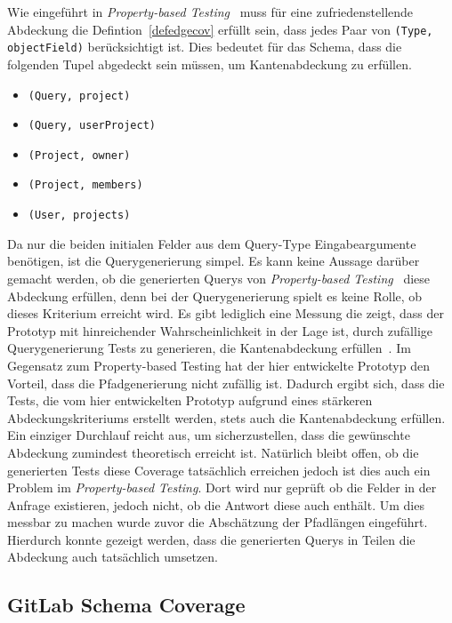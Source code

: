 Wie eingeführt in \textit{Property-based Testing}~\cite{property-based-testing} muss für eine zufriedenstellende Abdeckung
die Defintion~\ref{defedgecov} erfüllt sein, dass jedes Paar von \verb+(Type, objectField)+ berücksichtigt ist.
Dies bedeutet für das Schema, dass die folgenden Tupel abgedeckt sein müssen, um Kantenabdeckung zu erfüllen.
    \begin{itemize}
        \item \verb+(Query, project)+
        \item \verb+(Query, userProject)+
        \item \verb+(Project, owner)+
        \item \verb+(Project, members)+
        \item \verb+(User, projects)+
    \end{itemize}

Da nur die beiden initialen Felder aus dem Query-Type Eingabeargumente benötigen, ist die Querygenerierung simpel.
Es kann keine Aussage darüber gemacht werden, ob die generierten Querys von \textit{Property-based Testing}~\cite{property-based-testing} diese Abdeckung erfüllen, denn bei der Querygenerierung spielt es keine Rolle, ob dieses Kriterium erreicht wird.
Es gibt lediglich eine Messung die zeigt, dass der Prototyp mit hinreichender Wahrscheinlichkeit in der Lage ist, durch zufällige Querygenerierung Tests zu generieren, die Kantenabdeckung erfüllen~\cite[vgl. D.Results RQ1 ]{property-based-testing}.
Im Gegensatz zum Property-based Testing hat der hier entwickelte Prototyp den Vorteil, dass die Pfadgenerierung nicht zufällig ist.
Dadurch ergibt sich, dass die Tests, die vom hier entwickelten Prototyp aufgrund eines stärkeren Abdeckungskriteriums erstellt werden, stets auch die Kantenabdeckung erfüllen.
Ein einziger Durchlauf reicht aus, um sicherzustellen, dass die gewünschte Abdeckung zumindest theoretisch erreicht ist.
Natürlich bleibt offen, ob die generierten Tests diese Coverage tatsächlich erreichen jedoch ist dies auch ein Problem im \textit{Property-based Testing}.
Dort wird nur geprüft ob die Felder in der Anfrage existieren, jedoch nicht, ob die Antwort diese auch enthält.
Um dies messbar zu machen wurde zuvor die Abschätzung der Pfadlängen eingeführt.
Hierdurch konnte gezeigt werden, dass die generierten Querys in Teilen die Abdeckung auch tatsächlich umsetzen.

\subsection{GitLab Schema Coverage}

